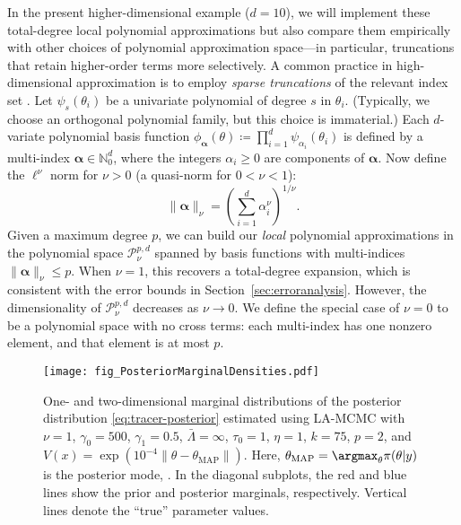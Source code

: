 In the present higher-dimensional example ($d=10$), we will implement these total-degree local polynomial approximations but also compare them empirically with other choices of polynomial approximation space---in particular, truncations that retain higher-order terms more selectively. A common practice in high-dimensional  approximation is to employ \emph{sparse truncations} of the relevant index set \citep{BlatmanSudret2011}. Let $\psi_s(\theta_i)$ be a univariate polynomial of degree $s$ in $\theta_i$. (Typically, we choose an orthogonal polynomial family, but this choice is immaterial.) Each $d$-variate polynomial basis function $\phi_{\bm{\alpha}}(\theta) \coloneqq \prod_{i=1}^{d} \psi_{\alpha_i}(\theta_i)$ is defined by a multi-index $\bm{\alpha} \in \mathbb{N}_0^d$, where the integers $\alpha_i \geq 0$ are components of $\bm{\alpha}$. Now define the $\ell^\nu$ norm for $\nu > 0$ (a quasi-norm for $0 < \nu < 1$): 
\begin{equation}
    \|\bm{\alpha}\|_{\nu} = \left(\sum_{i=1}^{d} \alpha_i^{\nu}\right)^{1/\nu}.
\end{equation}
Given a maximum degree $p$, we can build our \emph{local} polynomial approximations in the polynomial space $\mathcal{P}_\nu^{p,d}$ spanned by basis functions with multi-indices $\|\bm{\alpha}\|_{\nu} \leq p$. When $\nu=1$, this recovers a total-degree expansion, which is consistent with the error bounds in Section~\ref{sec:erroranalysis}. However, the dimensionality of $\mathcal{P}_\nu^{p,d}$ decreases as $\nu \rightarrow 0$. We define the special case of $\nu=0$ to be a polynomial space with no cross terms: each multi-index has one nonzero element, and that element is at most $p$. 

\begin{figure}[h!]
\centering
    \texttt{[image: fig\_PosteriorMarginalDensities.pdf]} 
    \caption{One- and two-dimensional marginal distributions of the posterior distribution \eqref{eq:tracer-posterior} estimated using LA-MCMC with $\nu=1$, $\gamma_0=500$, $\gamma_1=0.5$, $\bar{\Lambda}=\infty$, $\tau_0 = 1$, $\eta = 1$, $k=75$, $p=2$, and $V(x) = \exp{(10^{-4} \|\theta-\theta_{\text{MAP}}\|)}$. Here, $\theta_{\text{MAP}} = \argmax_{\theta}{\pi(\theta \vert y)}$ is the posterior mode, . In the diagonal subplots, the red and blue lines show the prior and posterior marginals, respectively. Vertical lines denote the ``true'' parameter values.}
    \label{fig:tracer-transport-marginals}
\end{figure}

